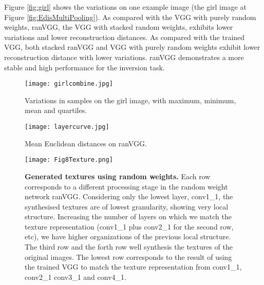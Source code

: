 \documentclass{article}
\begin{document}
Figure \ref{fig:girl} shows the variations on one example image (the girl image at Figure \ref{fig:EdisMultiPooling}).
As compared with the VGG with purely random weights, ranVGG, the VGG with stacked random weights, exhibits lower variations and lower reconstruction distances.
As compared with the trained VGG, both stacked ranVGG and VGG with purely random weights exhibit lower reconstruction distance with lower variations.
ranVGG demonstrates a more stable and high performance for the inversion task.


\begin{figure}[htbp]
\centering
	\begin{minipage}[b]{0.63\textwidth}
		\centering
		\texttt{[image: girlcombine.jpg]}
	    \vspace{-0.5em}
		\caption{Variations in samples on the girl image, with maximum, minimum, mean and quartiles.}
    	\label{fig:girl}
	\end{minipage} \hfill
	\begin{minipage}[b]{0.33\textwidth}
		\texttt{[image: layercurve.jpg]}
    	\vspace{-0.5em}
	    \caption{Mean Euclidean distances on ranVGG.}
        \label{fig:meanEdisCurve}
	\end{minipage}
\end{figure}








\begin{figure*}[htbp]
    \centering
    \texttt{[image: Fig8Texture.png]}
	\vspace{-0.5em}
	\caption{\textbf{Generated textures using random weights.} Each row corresponds to a different processing stage in the random weight network ranVGG.
Considering only the lowest layer, conv1\_1, the synthesised textures are of lowest granularity, showing very local structure.
 Increasing the number of layers on which we match the texture representation (conv1\_1 plus conv2\_1 for the second row, etc),
  we have higher organizations of the previous local structure. The third row and the forth row well synthesis the textures of the original images.
  The lowest row corresponds to the result of using the trained VGG to match the texture representation from conv1\_1, conv2\_1 conv3\_1 and conv4\_1.}%
	\label{fig:texture} %
\end{figure*}
\end{document}
